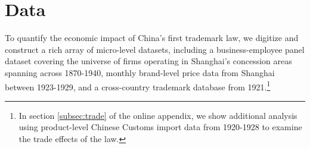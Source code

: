 \documentclass[12pt]{article}
\begin{document}
\section{Data} \label{sec:data}

To quantify the economic impact of China's first trademark law, we digitize and construct a rich array of micro-level datasets, including a business-employee panel dataset covering the universe of firms operating in Shanghai's concession areas spanning across 1870-1940, monthly brand-level price data from Shanghai between 1923-1929,  and a cross-country trademark database from 1921.\footnote{In section \ref{subsec:trade} of the online appendix, we show additional analysis using   product-level Chinese Customs import data from 1920-1928 to examine the trade effects of the law.} %


\end{document}
